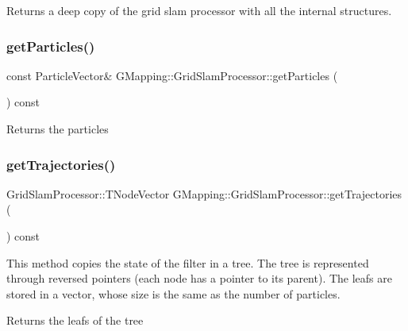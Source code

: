 \begin{DoxyReturn}{Returns}
a deep copy of the grid slam processor with all the internal structures. 
\end{DoxyReturn}
\mbox{\label{classGMapping_1_1GridSlamProcessor_ae6ed37b49322fa55dc65a53f737188d3}} 
\subsubsection{\texorpdfstring{get\+Particles()}{getParticles()}}
{\footnotesize\ttfamily const Particle\+Vector\& G\+Mapping\+::\+Grid\+Slam\+Processor\+::get\+Particles (\begin{DoxyParamCaption}{ }\end{DoxyParamCaption}) const\hspace{0.3cm}{\ttfamily [inline]}}

\begin{DoxyReturn}{Returns}
the particles 
\end{DoxyReturn}
\mbox{\label{classGMapping_1_1GridSlamProcessor_a78fbf89b86513284f191d6c96755ffcf}} 
\subsubsection{\texorpdfstring{get\+Trajectories()}{getTrajectories()}}
{\footnotesize\ttfamily Grid\+Slam\+Processor\+::\+T\+Node\+Vector G\+Mapping\+::\+Grid\+Slam\+Processor\+::get\+Trajectories (\begin{DoxyParamCaption}{ }\end{DoxyParamCaption}) const}

This method copies the state of the filter in a tree. The tree is represented through reversed pointers (each node has a pointer to its parent). The leafs are stored in a vector, whose size is the same as the number of particles. \begin{DoxyReturn}{Returns}
the leafs of the tree 
\end{DoxyReturn}
\mbox{\label{classGMapping_1_1GridSlamProcessor_ae7be39c0e2a9cea422e1a76c96a407b6}} 
